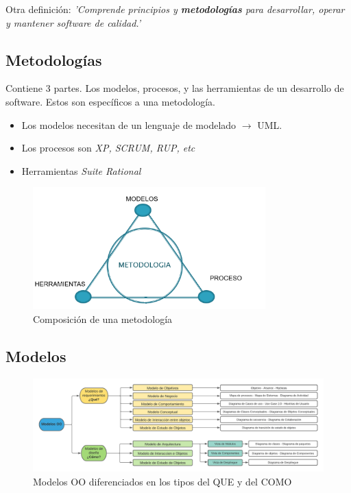 \documentclass[titlepage,a4paper]{article}
\begin{document}
Otra definición: \textit{'Comprende principios y \textbf{metodologías} para desarrollar, operar y mantener software de calidad.'}


\subsection{Metodologías}
Contiene 3 partes. Los modelos, procesos, y las herramientas de un desarrollo de software. Estos son específicos a una metodología.

    \begin{itemize}
        \item Los modelos necesitan de un lenguaje de modelado $\rightarrow$ UML.
        \item Los procesos son \textit{XP, SCRUM, RUP, etc}
        \item Herramientas \textit{Suite Rational}
    \end{itemize}
    
    \begin{figure}[!htb]
        \centering
        \includegraphics[width=0.8\textwidth]{Imagenes/Metodologias.png}
        \caption{Composición de una metodología}
    \end{figure}

\subsection{Modelos}


\begin{figure}[!htb]
    \centering
    \hspace*{-2.8cm}
    \includegraphics[width=1.3\textwidth]{Imagenes/ModelosOO.png}
    \caption{Modelos OO diferenciados en los tipos del QUE y del COMO}
\end{figure}
\end{document}
